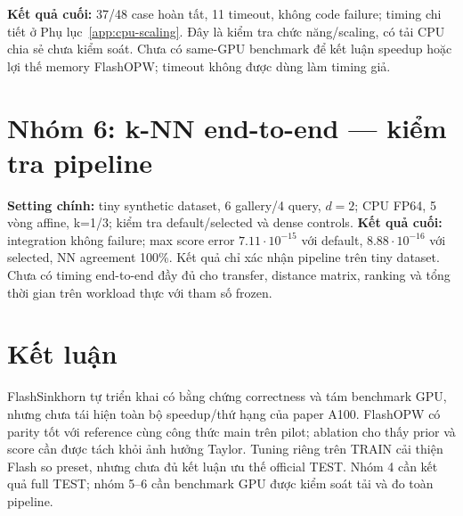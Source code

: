 \documentclass[11pt,a4paper]{article}
\begin{document}
\textbf{Kết quả cuối:} 37/48 case hoàn tất, 11 timeout, không code failure;
timing chi tiết ở Phụ lục~\ref{app:cpu-scaling}. Đây là kiểm tra chức năng/scaling,
có tải CPU chia sẻ chưa kiểm soát. Chưa có same-GPU benchmark để kết luận
speedup hoặc lợi thế memory FlashOPW; timeout không được dùng làm timing giả.

\section{Nhóm 6: k-NN end-to-end --- kiểm tra pipeline}
\label{sec:g6}
\textbf{Setting chính:} tiny synthetic dataset, 6 gallery/4 query, $d=2$;
CPU FP64, 5 vòng affine, k=1/3; kiểm tra default/selected và dense controls.
\textbf{Kết quả cuối:} integration không failure; max score error
$7.11\cdot10^{-15}$ với default, $8.88\cdot10^{-16}$ với selected,
NN agreement 100\%. Kết quả chỉ xác nhận pipeline trên tiny dataset.
Chưa có timing end-to-end đầy đủ cho transfer, distance matrix, ranking
và tổng thời gian trên workload thực với tham số frozen.

\section{Kết luận}
FlashSinkhorn tự triển khai có bằng chứng correctness và tám benchmark GPU,
nhưng chưa tái hiện toàn bộ speedup/thứ hạng của paper A100.
FlashOPW có parity tốt với reference cùng công thức main trên pilot;
ablation cho thấy prior và score cần được tách khỏi ảnh hưởng Taylor.
Tuning riêng trên TRAIN cải thiện Flash so preset, nhưng chưa đủ kết luận
ưu thế official TEST. Nhóm 4 cần kết quả full TEST; nhóm 5--6 cần benchmark
GPU được kiểm soát tải và đo toàn pipeline.

\appendix
\clearpage
\end{document}
